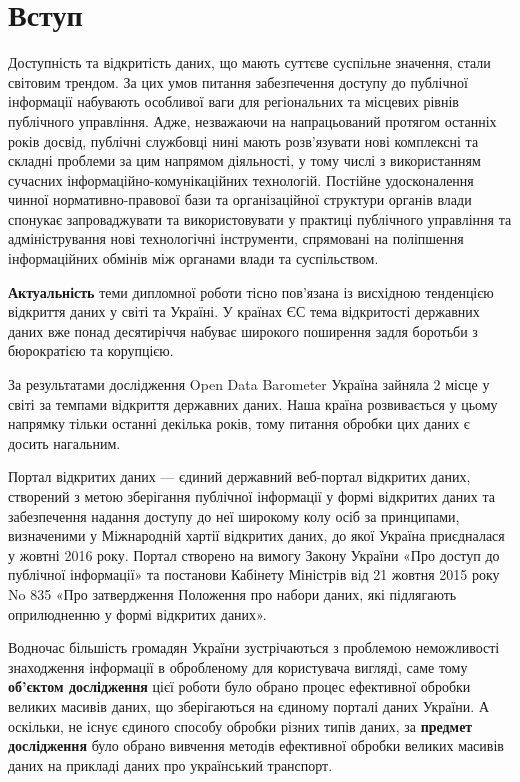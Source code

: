 \chapter*{Вступ}

Доступність та відкритість даних, що мають суттєве суспільне значення, стали світовим трендом.
За цих умов питання забезпечення доступу до публічної інформації набувають особливої ваги для регіональних та місцевих рівнів публічного управління.
Адже, незважаючи на напрацьований протягом останніх років досвід,
публічні службовці нині мають розв'язувати нові комплексні та складні проблеми за цим напрямом діяльності, у тому числі з
використанням сучасних інформаційно-комунікаційних технологій.
Постійне удосконалення чинної нормативно-правової бази та
організаційної структури органів влади спонукає запроваджувати та
використовувати у практиці публічного управління та адміністрування нові технологічні інструменти, спрямовані на поліпшення
інформаційних обмінів між органами влади та суспільством.

\textbf{Актуальність} теми дипломної роботи тісно пов'язана із висхідною
тенденцією відкриття даних у світі та Україні.
У країнах ЄС тема відкритості державних даних вже понад десятиріччя набуває широкого
поширення задля боротьби з бюрократією та корупцією.

За результатами дослідження Open Data Barometer Україна зайняла 2 місце у світі за темпами
відкриття державних даних.
Наша країна розвивається у цьому напрямку тільки останні декілька років,
тому питання обробки цих даних є досить нагальним.

Портал відкритих даних — єдиний державний веб-портал відкритих даних,
створений з метою зберігання публічної інформації у формі відкритих даних
та забезпечення надання доступу до неї широкому колу осіб за принципами,
визначеними у Міжнародній хартії відкритих даних, до якої Україна приєдналася
у жовтні 2016 року. Портал створено на вимогу Закону України «Про доступ до
публічної інформації» та постанови Кабінету Міністрів від 21 жовтня
2015 року No 835 «Про затвердження Положення про набори даних,
які підлягають оприлюдненню у формі відкритих даних».

Водночас більшість громадян України зустрічаються з проблемою неможливості
знаходження інформації в обробленому для користувача вигляді, саме тому
\textbf{об'єктом дослідження} цієї роботи було обрано процес ефективної обробки
великих масивів даних, що зберігаються на єдиному порталі даних України.
А оскільки, не існує єдиного способу обробки різних типів даних, за
\textbf{предмет дослідження} було обрано  вивчення методів ефективної обробки
великих масивів даних на прикладі даних про український транспорт.

